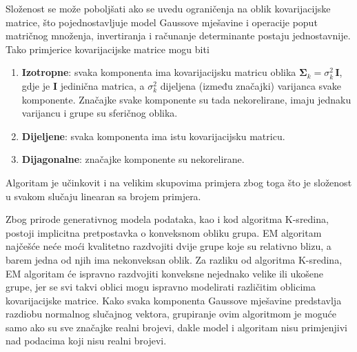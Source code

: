 \documentclass[times, utf8, zavrsni]{fer}
\begin{document}
Složenost se može poboljšati ako se uvedu ograničenja na oblik kovarijacijske matrice, što pojednostavljuje model Gaussove mješavine i operacije poput matričnog množenja, invertiranja i računanje determinante postaju jednostavnije. Tako primjerice kovarijacijske matrice mogu biti
\begin{enumerate}
    \item \textbf{Izotropne}: svaka komponenta ima kovarijacijsku matricu oblika $\boldsymbol{\Sigma}_k = \sigma_{k}^2 \, \mathbf{I}$, gdje je $\mathbf{I}$ jedinična matrica, a $\sigma_{k}^2$ dijeljena (između značajki) varijanca svake komponente. Značajke svake komponente su tada nekorelirane, imaju jednaku varijancu i grupe su sferičnog oblika.
    \item \textbf{Dijeljene}: svaka komponenta ima istu kovarijacijsku matricu.
    \item \textbf{Dijagonalne}: značajke komponente su nekorelirane.
\end{enumerate}
Algoritam je učinkovit i na velikim skupovima primjera zbog toga što je složenost u svakom slučaju linearan sa brojem primjera.

Zbog prirode generativnog modela podataka, kao i kod algoritma K-sredina, postoji implicitna pretpostavka o konveksnom obliku grupa. EM algoritam najčešće neće moći kvalitetno razdvojiti dvije grupe koje su relativno blizu, a barem jedna od njih ima nekonveksan oblik. Za razliku od algoritma K-sredina, EM algoritam će ispravno razdvojiti konveksne nejednako velike ili ukošene grupe, jer se svi takvi oblici mogu ispravno modelirati različitim oblicima kovarijacijske matrice. Kako svaka komponenta Gaussove mješavine predstavlja razdiobu normalnog slučajnog vektora, grupiranje ovim algoritmom je moguće samo ako su sve značajke realni brojevi, dakle model i algoritam nisu primjenjivi nad podacima koji nisu realni brojevi.
\end{document}
